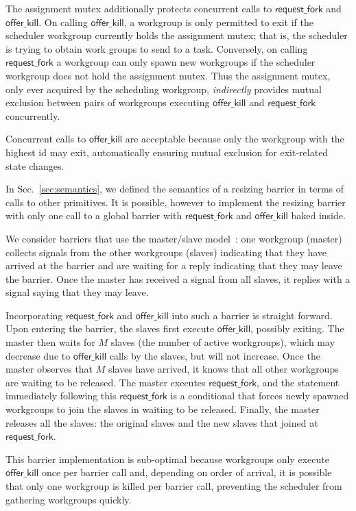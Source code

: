 \documentclass[sigconf]{acmart}
\newcommand{\mysec}{Sec.~}
\newcommand{\offerfork}{\mathsf{request\_fork}}
\newcommand{\offerkill}{\mathsf{offer\_kill}}
\begin{document}
{The assignment mutex additionally protects concurrent calls to
$\offerfork$ and $\offerkill$.  On calling $\offerkill$, a workgroup
is only permitted to exit if the scheduler workgroup currently holds
the assignment mutex; that is, the scheduler is trying to obtain work
groups to send to a task.  Conversely, on calling $\offerfork$ a
workgroup can only spawn new workgroups if the scheduler workgroup
does not hold the assignment mutex.  Thus the assignment mutex, only
ever acquired by the scheduling workgroup, \emph{indirectly} provides
mutual exclusion between pairs of workgroups executing $\offerkill$
and $\offerfork$ concurrently.

Concurrent calls to $\offerkill$ are acceptable because only the
workgroup with the highest id may exit, automatically ensuring mutual
exclusion for exit-related state changes.

%
In \mysec\ref{sec:semantics}, we defined the semantics of a resizing
barrier in terms of calls to other primitives.  It is possible,
however to implement the resizing barrier with only one call to a
global barrier with $\offerfork$ and $\offerkill$ baked inside.

We consider barriers that use the master/slave model~\cite{XF10}: one
workgroup (master) collects signals from the other workgroups (slaves)
indicating that they have arrived at the barrier and are waiting for a
reply indicating that they may leave the barrier. Once the master has
received a signal from all slaves, it replies with a signal saying that
they may leave.

Incorporating $\offerfork$ and $\offerkill$ into such a barrier is
straight forward. Upon entering the barrier, the slaves first execute
$\offerkill$, possibly exiting. The master then waits for $M$ slaves
(the number of active workgroups), which may decrease due to
$\offerkill$ calls by the slaves, but will not increase. Once the
master observes that $M$ slaves have arrived, it knows that all other
workgroups are waiting to be released. The master executes
$\offerfork$, and the statement immediately following this
$\offerfork$ is a conditional that forces newly spawned workgroups to
join the slaves in waiting to be released. Finally, the master
releases all the slaves: the original slaves and the new slaves that
joined at $\offerfork$.

This barrier implementation is sub-optimal because workgroups only
execute $\offerkill$ once per barrier call and, depending on order of
arrival, it is possible that only one workgroup is killed per barrier
call, preventing the scheduler from gathering workgroups quickly.

}
\end{document}
